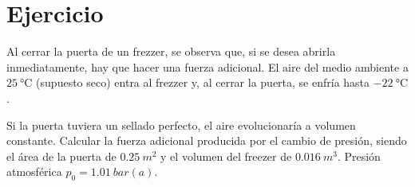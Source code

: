 \section{Ejercicio}\label{ej:Chap03Ejercicio07}

Al cerrar la puerta de un frezzer, se observa que, si se desea abrirla inmediatamente, hay que hacer una fuerza adicional. El aire del medio ambiente a $\SI{25}{\celsius}$ (supuesto seco) entra al frezzer y, al cerrar la puerta, se enfría hasta $\SI{-22}{\celsius}$. 

Si la puerta tuviera un sellado perfecto, el aire evolucionaría a volumen constante. Calcular la fuerza adicional producida por el
cambio de presión, siendo el área de la puerta de $\SI{0.25}{m^2}$ y el volumen del freezer de $\SI{0.016}{m^3}$. Presión atmosférica $p_0 = \SI{1.01}{bar(a)}$.